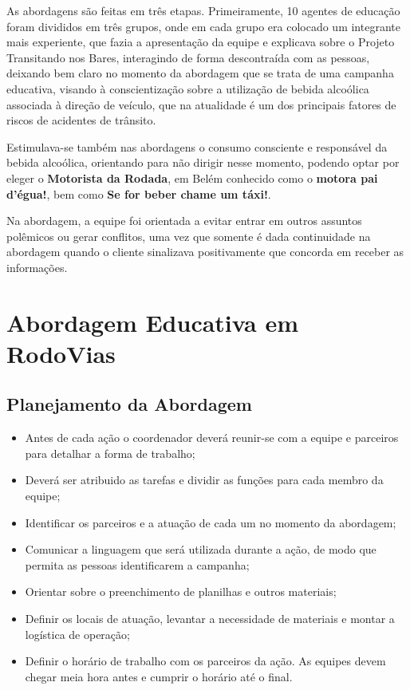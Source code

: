 As abordagens são feitas em três etapas. Primeiramente, 10 agentes de educação foram divididos em três grupos, onde em cada grupo era colocado um integrante mais experiente, que fazia a apresentação da equipe e explicava sobre o Projeto Transitando nos Bares, interagindo de forma descontraída com as pessoas, deixando bem claro no momento da abordagem que se trata de uma campanha educativa, visando à conscientização sobre a utilização de bebida alcoólica associada à direção de veículo, que na atualidade é um dos principais fatores de riscos de acidentes de trânsito. \vskip0.3cm

Estimulava-se também nas abordagens o consumo consciente e responsável da bebida alcoólica, orientando para não dirigir nesse momento, podendo optar por eleger o \textbf{Motorista da Rodada}, em Belém conhecido como o \textbf{motora pai d’égua!}, bem como \textbf{Se for beber chame um táxi!}.\vskip0.3cm 

Na abordagem, a equipe foi orientada a evitar entrar em outros assuntos polêmicos ou gerar conflitos, uma vez que somente é dada continuidade na abordagem quando o cliente sinalizava positivamente que concorda em receber as informações.






\newpage
\section{Abordagem Educativa em RodoVias}
\subsection{Planejamento da Abordagem}

\begin{itemize}
\item Antes de cada ação o coordenador deverá reunir-se com a equipe e parceiros para detalhar a forma de  trabalho;
\item Deverá ser atribuido as tarefas e dividir as funções para cada membro da equipe;
\item Identificar os parceiros e a atuação de cada um no momento da abordagem;
\item Comunicar a linguagem que será utilizada durante a ação, de modo que permita as pessoas identificarem a campanha;
\item Orientar sobre o preenchimento de planilhas e outros materiais;
\item Definir os locais de atuação, levantar a necessidade de materiais e montar a logística de operação;
\item Definir o horário de trabalho com os parceiros da ação. As equipes devem chegar meia hora antes e cumprir o horário até o final.  
\end{itemize}

